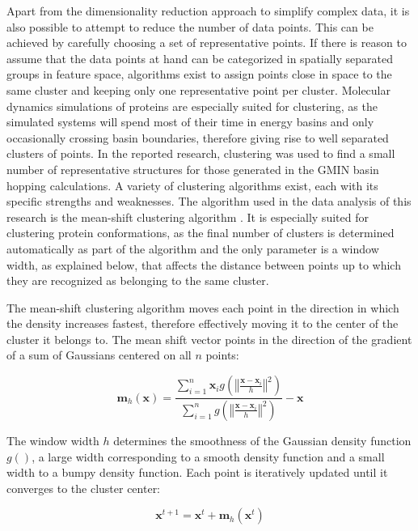 \documentclass[english, a4paper, 12pt, titlepage, draft]{article}
\newcommand{\vect}[1]{\mathbf{#1}}
\newcommand{\norm}[1]{\left\Vert#1\right\Vert}
\newcommand{\fun}[2]{#1\left(#2\right)}
\begin{document}
Apart from the dimensionality reduction approach to simplify complex data, it is also possible to attempt to reduce the number of data points.
This can be achieved by carefully choosing a set of representative points.
If there is reason to assume that the data points at hand can be categorized in spatially separated groups in feature space, algorithms exist to assign points close in space to the same cluster and keeping only one representative point per cluster.
Molecular dynamics simulations of proteins are especially suited for clustering, as the simulated systems will spend most of their time in energy basins and only occasionally crossing basin boundaries, therefore giving rise to well separated clusters of points.
In the reported research, clustering was used to find a small number of representative structures for those generated in the GMIN basin hopping calculations.
A variety of clustering algorithms exist, each with its specific strengths and weaknesses.
The algorithm used in the data analysis of this research is the mean-shift clustering algorithm \cite{meanShift}.
It is especially suited for clustering protein conformations, as the final number of clusters is determined automatically as part of the algorithm and the only parameter is a window width, as explained below, that affects the distance between points up to which they are recognized as belonging to the same cluster.

The mean-shift clustering algorithm moves each point in the direction in which the density increases fastest, therefore effectively moving it to the center of the cluster it belongs to.
The mean shift vector points in the direction of the gradient of a sum of Gaussians centered on all $n$ points:

\newcommand{\g}{\fun{g}{\norm{\frac{\vect{x} - \vect{x}_i}{h}}^2}}
\newcommand{\sumi}{\sum_{i=1}^{n}}

\begin{equation}
    \vect{m}_h(\vect{x}) = \frac{\sumi \vect{x}_i \g}{\sumi \g} - \vect{x}
\end{equation}

The window width $h$ determines the smoothness of the Gaussian density function $g()$, a large width corresponding to a smooth density function and a small width to a bumpy density function.
Each point is iteratively updated until it converges to the cluster center:

\begin{equation}
    \vect{x}^{t+1} = \vect{x}^t + \vect{m}_h(\vect{x}^t)
\end{equation}
\end{document}

